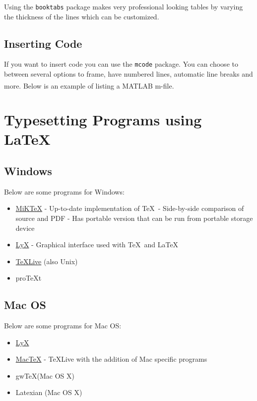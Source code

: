 \documentclass[12pt]{report}
\begin{document}
Using the \verb'booktabs' package makes very professional looking tables by varying the thickness of the lines which can be customized.

\clearpage \section{Inserting Code}
If you want to insert code you can use the \verb'mcode' package.  You can choose to between several options to frame, have numbered lines, automatic line breaks and more.  Below is an example of listing a MATLAB\textsuperscript{\textregistered} m-file.



\chapter[Programs]{Typesetting Programs using \LaTeX\ }
\section{Windows}
Below are some programs for Windows:
\begin{itemize}
\item \href{http://miktex.org/}{MiK\TeX}
\subitem- Up-to-date implementation of \TeX\ 
\subitem- Side-by-side comparison of source and PDF
\subitem- Has portable version that can be run from portable storage device
\item \href{http://www.lyx.org/}{LyX}
\subitem- Graphical interface used with \TeX\ and \LaTeX\ 
\item \href{http://www.tug.org/texlive/}{\TeX Live} (also Unix)
\item pro\TeX t
\end{itemize}

\section{Mac OS}
Below are some programs for Mac OS:
\begin{itemize}
\item \href{http://www.lyx.org/}{LyX}
\item\href{http://www.tug.org/mactex/}{Mac\TeX}
\subitem- \TeX Live with the addition of Mac specific programs
\item gw\TeX  (Mac OS X)
\item Latexian (Mac OS X)
\end{itemize}
\end{document}
